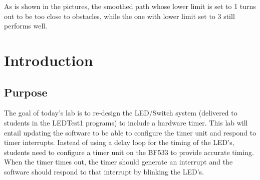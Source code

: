 \documentclass[aps,letterpaper,10pt]{revtex4}
\begin{document}
\vspace{5mm}
	
	\vspace{3mm}
	
\vspace{3mm}
As is shown in the pictures, the smoothed path whose lower limit is set to 1 turns out to be too close to obstacles, while the one with lower limit set to 3 still performs well. 

\vspace{5mm}
	
	\vspace{3mm}







\section{Introduction}
\subsection{Purpose}

The goal of today’s lab is to re-design the LED/Switch system (delivered to students in the LEDTest1 programs) to include a hardware timer.  This lab will entail updating the software to be able to configure the timer unit and respond to timer interrupts.  Instead of using a delay loop for the timing of the LED’s, students need to configure a timer unit on the BF533 to provide accurate timing.  When the timer times out, the timer should generate an interrupt and the software should respond to that interrupt by blinking the LED’s. \vspace{3mm} %
\end{document}
